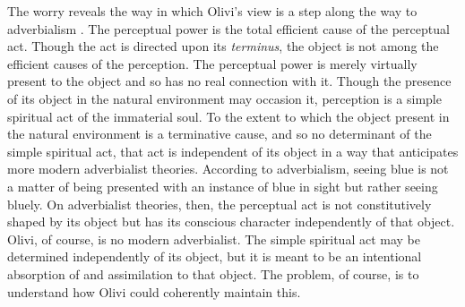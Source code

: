 The worry reveals the way in which Olivi's view is a step along the way to adverbialism \citep[see][]{Ducasse:1942oq}. The perceptual power is the total efficient cause of the perceptual act. Though the act is directed upon its \emph{terminus}, the object is not among the efficient causes of the perception. The perceptual power is merely virtually present to the object and so has no real connection with it. Though the presence of its object in the natural environment may occasion it, perception is a simple spiritual act of the immaterial soul. To the extent to which the object present in the natural environment is a terminative cause, and so no determinant of the simple spiritual act, that act is independent of its object in a way that anticipates more modern adverbialist theories. According to adverbialism, seeing blue is not a matter of being presented with an instance of blue in sight but rather seeing bluely. On adverbialist theories, then, the perceptual act is not constitutively shaped by its object but has its conscious character independently of that object. Olivi, of course, is no modern adverbialist. The simple spiritual act may be determined independently of its object, but it is meant to be an intentional absorption of and assimilation to that object. The problem, of course, is to understand how Olivi could coherently maintain this.

